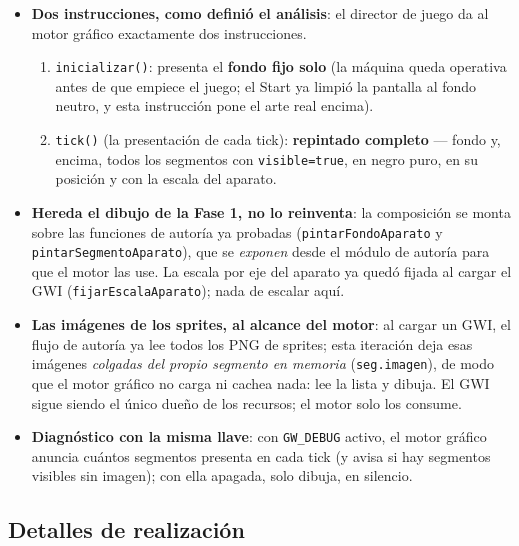 \begin{itemize}
	\item \textbf{Dos instrucciones, como definió el análisis}: el director de juego da al
	motor gráfico exactamente dos instrucciones. 
	
	\begin{enumerate}
		\item 	\texttt{inicializar()}: presenta el	\textbf{fondo fijo solo} (la máquina queda operativa antes de que empiece el juego;	el Start ya limpió la pantalla al fondo neutro, y esta instrucción pone el arte real encima). 
		\item 	\texttt{tick()} (la presentación de cada tick): \textbf{repintado completo} --- fondo y, encima, todos los segmentos con \texttt{visible=true}, en negro puro, en su posición y con la escala del aparato.
	\end{enumerate}

	\item \textbf{Hereda el dibujo de la Fase 1, no lo reinventa}: la composición se monta
	sobre las funciones de autoría ya probadas (\texttt{pintarFondoAparato} y
	\texttt{pintarSegmentoAparato}), que se \emph{exponen} desde el módulo de autoría para
	que el motor las use. La escala por eje del aparato ya quedó fijada al cargar el GWI
	(\texttt{fijarEscalaAparato}); nada de escalar aquí.

	\item \textbf{Las imágenes de los sprites, al alcance del motor}: al cargar un GWI, el
	flujo de autoría ya lee todos los PNG de sprites; esta iteración deja esas imágenes
	\emph{colgadas del propio segmento en memoria} (\texttt{seg.imagen}), de modo que el
	motor gráfico no carga ni cachea nada: lee la lista y dibuja. El GWI sigue siendo el
	único dueño de los recursos; el motor solo los consume.

	\item \textbf{Diagnóstico con la misma llave}: con \texttt{GW\_DEBUG} activo, el motor
	gráfico anuncia cuántos segmentos presenta en cada tick (y avisa si hay segmentos
	visibles sin imagen); con ella apagada, solo dibuja, en silencio.
\end{itemize}

\subsection{Detalles de realización}
\label{subsec:DetallesF2I4}

